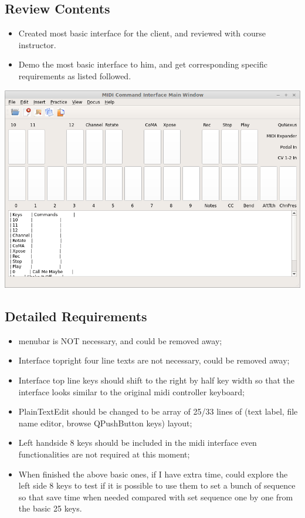 \documentclass[9pt,b5paper]{article}
\begin{document}
\subsection{Review Contents}
\label{sec-2-1}
\begin{itemize}
\item Created most basic interface for the client, and reviewed with course instructor.
\item Demo the most basic interface to him, and get corresponding specific requirements as listed followed.
\end{itemize}

\includegraphics[width=.9\linewidth]{./pic/2014-11-20_21:52:19.png}

\subsection{Detailed Requirements}
\label{sec-2-2}
\begin{itemize}
\item menubar is NOT necessary, and could be removed away;
\item Interface topright four line texts are not necessary, could be removed away;
\item Interface top line keys should shift to the right by half key width so that the interface looks similar to the original midi controller keyboard;
\item PlainTextEdit should be changed to be array of 25/33 lines of (text label, file name editor, browse QPushButton keys) layout;
\item Left handside 8 keys should be included in the midi interface even functionalities are not required at this moment;
\item When finished the above basic ones, if I have extra time, could explore the left side 8 keys to test if it is possible to use them to set a bunch of sequence so that save time when needed compared with set sequence one by one from the basic 25 keys.
\end{itemize}
\end{document}
